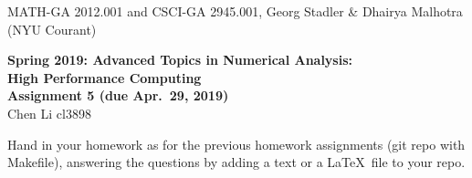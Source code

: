 \documentclass[12pt]{article}
\begin{document}
\begin{center}
  \vspace*{-2cm}
{\small MATH-GA 2012.001 and CSCI-GA 2945.001, Georg Stadler \&
  Dhairya Malhotra (NYU Courant)}
\end{center}
\vspace*{.5cm}
\begin{center}
\large \textbf{%
Spring 2019: Advanced Topics in Numerical Analysis: \\
High Performance Computing \\
Assignment 5 (due Apr.\ 29, 2019) }\\
Chen Li cl3898
\end{center}

 Hand in your homework as for
the previous homework assignments (git repo with Makefile), answering
the questions by adding a text or a \LaTeX\ file to your repo.
\\[.2ex]
\end{document}
